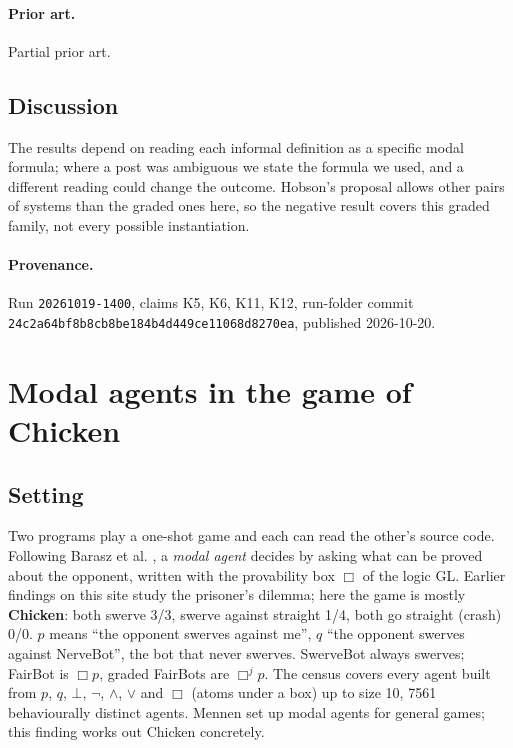 \documentclass{article}
\begin{document}
\paragraph{Prior art.} Partial prior art.

\subsection*{Discussion}

The results depend on reading each informal definition as a specific modal formula; where a post
was ambiguous we state the formula we used, and a different reading could change the outcome.
Hobson's proposal allows other pairs of systems than the graded ones here, so the negative result
covers this graded family, not every possible instantiation.

\paragraph{Provenance.}
Run \texttt{20261019-1400}, claims K5, K6, K11, K12, run-folder commit \texttt{24c2a64bf8b8cb8be184b4d449ce11068d8270ea}, published 2026-10-20.

\section{Modal agents in the game of Chicken}
\label{sec:chicken-modal-agents}

\subsection*{Setting}

Two programs play a one-shot game and each can read the other's source code. Following Barasz et
al. \cite{barasz2014robust}, a \emph{modal agent} decides by asking what can be proved about the opponent,
written with the provability box $\Box$ of the logic GL. Earlier findings on this site study the
prisoner's dilemma; here the game is mostly \textbf{Chicken}: both swerve 3/3, swerve against straight
1/4, both go straight (crash) 0/0. $p$ means ``the opponent swerves against me'', $q$ ``the opponent
swerves against NerveBot'', the bot that never swerves. SwerveBot always swerves; FairBot is
$\Box p$, graded FairBots are $\Box^j p$. The census covers every agent built from $p$, $q$, $\bot$,
$\neg$, $\wedge$, $\vee$ and $\Box$ (atoms under a box) up to size 10, 7561 behaviourally distinct
agents. Mennen \cite{mennen2017modal} set up modal agents for general games; this finding works out
Chicken concretely.
\end{document}
